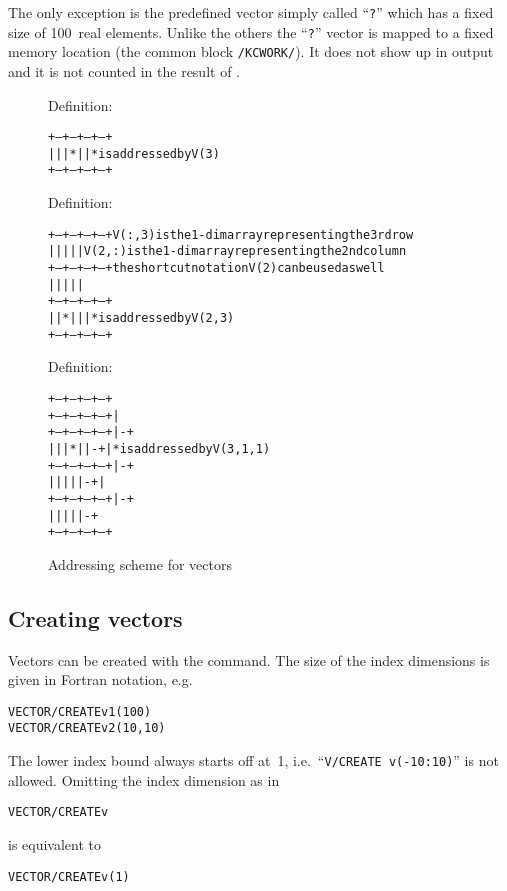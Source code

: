 The only exception is the predefined vector simply called ``\texttt{?}''
which has a fixed size of 100~real elements.
Unlike the others the ``\texttt{?}'' vector is mapped to a fixed memory
location (the common block \texttt{/KCWORK/}).
It does not show up in  output and it is not counted
in the result of .


\begin{figure}
Definition: 
\begin{alltt} 
+---+---+---+---+
|   |   | * |   |   * {\rm is addressed by} V(3)
+---+---+---+---+
\end{alltt} 

Definition: 
\begin{alltt} 
+---+---+---+---+               V(:,3) {\rm is the 1-dim array representing the 3rd row}
|   |   |   |   |               V(2,:) {\rm is the 1-dim array representing the 2nd column}
+---+---+---+---+                      {\rm the shortcut notation \texttt{V(2)} can be used as well}
|   |   |   |   |
+---+---+---+---+
|   | * |   |   |   * {\rm is addressed by} V(2,3)
+---+---+---+---+
\end{alltt} 

Definition: 
\begin{alltt} 
    +---+---+---+---+
  +---+---+---+---+ |
+---+---+---+---+ |-+
|   |   | * |   |-+ |   * {\rm is addressed by} V(3,1,1)
+---+---+---+---+ |-+
|   |   |   |   |-+ |
+---+---+---+---+ |-+
|   |   |   |   |-+
+---+---+---+---+  
\end{alltt}
\caption{Addressing scheme for vectors
\label{fig-vector-addressing}}
\end{figure}

\subsection{Creating vectors}

Vectors can be created with the  command.
The size of the index dimensions is given in Fortran notation, e.g.\
\begin{alltt}
VECTOR/CREATE v1(100)
VECTOR/CREATE v2(10,10)
\end{alltt}
The lower index bound always starts off at~1, i.e.\ 
``\texttt{V/CREATE v(-10:10)}'' is not allowed.
Omitting the index dimension as in
\begin{alltt}
VECTOR/CREATE v
\end{alltt}
is equivalent to
\begin{alltt}
VECTOR/CREATE v(1)
\end{alltt}

